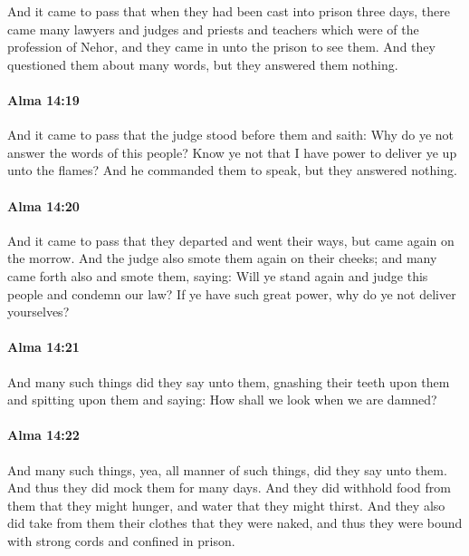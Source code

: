 			And it came to pass that when they had been cast into prison three days,
			there came many lawyers and judges and priests and teachers
			which were of the profession of Nehor,
			and they came in unto the prison to see them.
			And they questioned them about many words,
			but they answered them nothing.

		\paragraph{Alma 14:19} %
			\label{ALMA-14-19}

			And it came to pass that the judge stood before them and saith:
			Why do ye not answer the words of this people?
			Know ye not that I have power to deliver ye up unto the flames?
			And he commanded them to speak, but they answered nothing.

		\paragraph{Alma 14:20} %
			\label{ALMA-14-20}

			And it came to pass that they departed and went their ways,
			but came again on the morrow.
			And the judge also smote them again on their cheeks;
			and many came forth also and smote them, saying:
			Will ye stand again and judge this people and condemn our law?
			If ye have such great power,
			why do ye not deliver yourselves?

		\paragraph{Alma 14:21} %
			\label{ALMA-14-21}

			And many such things did they say unto them,
			gnashing their teeth upon them and spitting upon them and saying:
			How shall we look when we are damned?

		\paragraph{Alma 14:22} %
			\label{ALMA-14-22}

			And many such things,
			yea, all manner of such things,
			did they say unto them.
			And thus they did mock them for many days.
			And they did withhold food from them that they might hunger,
			and water that they might thirst.
			And they also did take from them their clothes that they were naked,
			and thus they were bound with strong cords and confined in prison.

